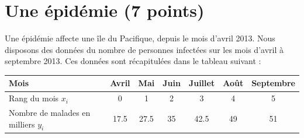 \section{Une épidémie (7 points)}

Une épidémie affecte une île du Pacifique, depuis le mois d'avril 2013. Nous disposons des données du nombre de personnes infectées sur les mois d'avril à septembre 2013. Ces données sont récapitulées dans le tableau suivant :

\vspace*{0.5cm} 
\begin{center}
	\begin{tabular}{|@{\ }l@{\ }|@{\ }c@{\ }|@{\ }c@{\ }|@{\ }c@{\ }|@{\ }c@{\ }|@{\ }c@{\ }|@{\ }c@{\ }|}
		\hline
		Mois                                & Avril      & Mai        & Juin & Juillet    & Août & Septembre \\ \hline
		Rang du mois $x_i$                  & 0          & 1          & 2    & 3          & 4    & 5         \\ \hline
		Nombre de malades en milliers $y_i$ & \num{17.5} & \num{27.5} & 35   & \num{42.5} & 49   & 51        \\ \hline
	\end{tabular}
\end{center}

